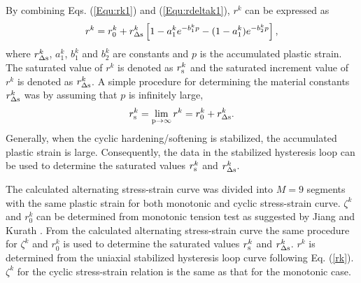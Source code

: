 \documentclass[preprint,5p,twocolumn,11pt,sort&compress]{elsarticle}
\begin{document}
By combining Eqs. (\ref{Equ:rk1}) and (\ref{Equ:rdeltak1}), $r^k$ can be expressed as
\begin{equation}
\label{rk}
{r^k} = r_0^k + r_{\Delta \rm s}^k\left[ {1 - a_1^k{e^{ - b_1^kp}} - (1-a_1^k){e^{ - b_2^kp}} }\right],
\end{equation}
where $r_{\Delta \rm s}^k$, $a_1^k$, $b_1^k$ and $b_2^k$ are constants and $p$ is the accumulated plastic strain.
The saturated value of $r^k$ is denoted as $r^k_{\rm s}$ and the saturated increment value of $r^k$ is denoted as $r^k_{\Delta \rm s}$.
A simple procedure for determining the material constants $r_{\Delta \rm s}^k$ was by assuming that $p$ is infinitely large,
\begin{equation}
r_{\rm s}^k=\mathop {\lim }\limits_{{\rm{p}} \to \infty } {r^k} = r_0^k + r_{\Delta \rm s}^k.
\label{Equ:rsk}
\end{equation}
Generally, when the cyclic hardening/softening is stabilized, the accumulated plastic strain is large.
Consequently, the data in the stabilized hysteresis loop can be used to determine the saturated values $r^k_{\rm s}$ and $r^k_{\Delta \rm s}$.

The calculated alternating stress-strain curve was divided into $M=9$ segments with the same plastic strain for both monotonic and cyclic stress-strain curve.  $\zeta^k$ and $r_0^k$ can be determined from monotonic tension test as suggested by Jiang and Kurath \cite{Jiang1996387}. From the calculated alternating stress-strain curve the same procedure for $\zeta^k$ and $r_0^k$ is used to determine the saturated values $r^k_{\rm s}$ and $r^k_{\Delta \rm s}$.  $r^k$ is determined from the uniaxial stabilized hysteresis loop curve following Eq. (\ref{rk}). ${\zeta ^k}$ for the cyclic stress-strain relation is the same as that for the monotonic case.

\end{document}
